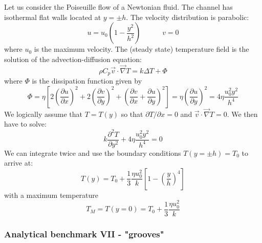 Let us consider the Poiseuille flow of a Newtonian fluid. The channel has 
isothermal flat walls located at $y=\pm h$. The velocity distribution is parabolic:
\[
u = u_0 \left(1-\frac{y^2}{h^2} \right) 
\quad\quad\quad
v=0
\]
where $u_0$ is the maximum velocity. The (steady state) temperature field is the solution of
the advection-diffusion equation:
\[
\rho C_p \vec v \cdot \vec\nabla T
= k \Delta T + \Phi
\]
where $\Phi$ is the dissipation function given by
\[
\Phi
=\eta \left[  
2\left(\frac{\partial u}{\partial x} \right)^2 + 
2\left(\frac{\partial v}{\partial y} \right)^2 +
\left( \frac{\partial v}{\partial x} + \frac{\partial u}{\partial y} \right)^2
\right]
=
\eta \left( \frac{\partial u}{\partial y} \right)^2 = 4 \eta \frac{u_0^2 y^2}{h^4}
\]
We logically assume that $T=T(y)$ so that $\partial T/\partial x=0$ and $\vec v \cdot \vec\nabla T=0$.
We then have to solve:
\[
k \frac{\partial^2 T}{\partial y^2} + 4 \eta \frac{u_0^2 y^2}{h^4} = 0
\]
We can integrate twice and use the boundary conditions $T(y=\pm h)=T_0$ to arrive at:
\[
T(y) = T_0 + \frac{1}{3} \frac{\eta u_0^2}{k} \left[ 1-\left(\frac{y}{h}\right)^4  \right]
\]
with a maximum temperature
\[
T_M = T(y=0) = T_0 + \frac{1}{3} \frac{\eta u_0^2}{k} 
\]

\subsubsection{Analytical benchmark VII \label{mms7} - "grooves"}

